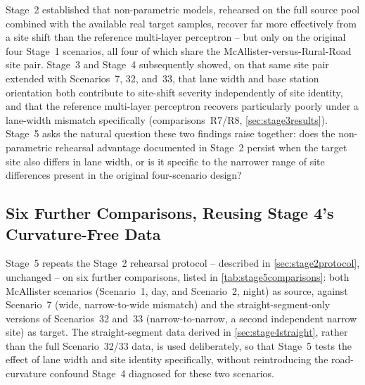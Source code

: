 \documentclass{iutbscthesis}
\begin{document}
Stage~2 established that non-parametric models, rehearsed on the full source pool combined with the available real target samples, recover far more effectively from a site shift than the reference multi-layer perceptron -- but only on the original four Stage~1 scenarios, all four of which share the McAllister-versus-Rural-Road site pair. Stage~3 and Stage~4 subsequently showed, on that same site pair extended with Scenarios~7, 32, and~33, that lane width and base station orientation both contribute to site-shift severity independently of site identity, and that the reference multi-layer perceptron recovers particularly poorly under a lane-width mismatch specifically (comparisons~R7/R8, \autoref{sec:stage3results}). Stage~5 asks the natural question these two findings raise together: does the non-parametric rehearsal advantage documented in Stage~2 persist when the target site also differs in lane width, or is it specific to the narrower range of site differences present in the original four-scenario design?

\subsection{Six Further Comparisons, Reusing Stage 4's Curvature-Free Data}

Stage~5 repeats the Stage~2 rehearsal protocol -- described in \autoref{sec:stage2protocol}, unchanged -- on six further comparisons, listed in \autoref{tab:stage5comparisons}: both McAllister scenarios (Scenario~1, day, and Scenario~2, night) as source, against Scenario~7 (wide, narrow-to-wide mismatch) and the straight-segment-only versions of Scenarios~32 and~33 (narrow-to-narrow, a second independent narrow site) as target. The straight-segment data derived in \autoref{sec:stage4straight}, rather than the full Scenario~32/33 data, is used deliberately, so that Stage~5 tests the effect of lane width and site identity specifically, without reintroducing the road-curvature confound Stage~4 diagnosed for these two scenarios.
\end{document}

